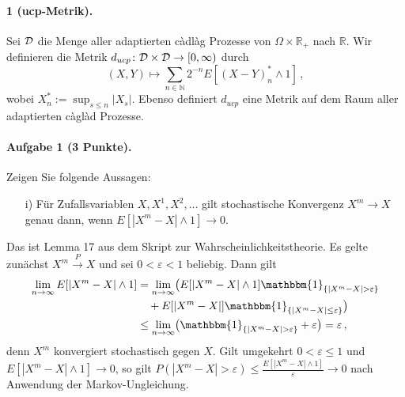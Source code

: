 \documentclass{article}
\begin{document}
\paragraph{ 1 (ucp-Metrik).}
Sei ${\cal D}$ die Menge aller adaptierten càdlàg Prozesse von $\Omega\times\mathbb{R}_+$ nach $\mathbb{R}$.
Wir definieren die Metrik $d_{ucp}\colon {\cal D}\times {\cal D}\to[0,\infty)$ durch
\begin{equation}
(X,Y)\mapsto \sum_{n\in\mathbb{N}}2^{-n}E[(X-Y)^*_n\wedge 1]\,,
\end{equation}
wobei $X^*_n:=\sup_{s\leq n}|X_s|$.
Ebenso definiert $d_{ucp}$ eine Metrik auf dem Raum aller adaptierten càglàd Prozesse.

\paragraph{Aufgabe 1 \textnormal{(3 Punkte)}.}
Zeigen Sie folgende Aussagen:
\begin{enumerate}
\item [i)] Für Zufallsvariablen $X,X^1,X^2,\dots$ gilt stochastische Konvergenz $X^m\to X$ genau dann, wenn $E[|X^m-X|\wedge 1]\rightarrow0$.
\end{enumerate}
Das ist Lemma 17 aus dem Skript zur Wahrscheinlichkeitstheorie.
Es gelte zunächst $X^m\xrightarrow{P}X$ und sei $0<\varepsilon<1$ beliebig.
Dann gilt
\begin{align*}
  \lim_{n\to\infty}E[|X^m-X|\wedge1]
  &=\lim_{n\to\infty}\bigl(E[|X^m-X|\wedge1]\mathbbm{1}_{\{|X^m-X|>\varepsilon\}}\\
  &\quad+E[|X^m-X|]\mathbbm{1}_{\{|X^m-X|\leq\varepsilon\}}\bigr)\\
  &\leq\lim_{n\to\infty}\bigl(\mathbbm{1}_{\{|X^m-X|>\varepsilon\}}+\varepsilon\bigr)=\varepsilon\,,
\end{align*}
denn $X^m$ konvergiert stochastisch gegen $X$.
Gilt umgekehrt $0<\varepsilon\leq 1$ und $E[|X^m-X|\wedge 1]\to0$, so gilt $P(|X^m-X|>\varepsilon)\leq\frac{E[|X^m-X|\wedge1]}{\varepsilon}\to0$ nach Anwendung der Markov-Ungleichung.
\pagebreak
\end{document}
